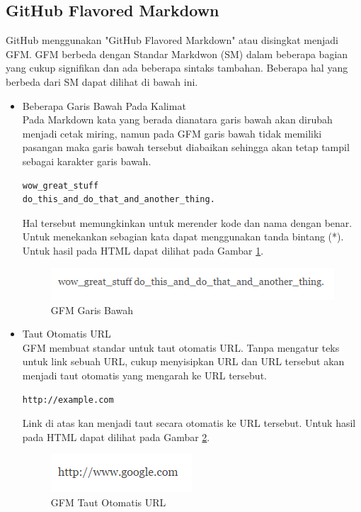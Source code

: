 \begin{itemize}
\begin{itemize}
\subsection{GitHub Flavored Markdown \cite{Markdown:2015}}
GitHub menggunakan "GitHub Flavored Markdown" atau disingkat menjadi GFM. GFM
berbeda dengan Standar Markdwon (SM) dalam beberapa bagian yang cukup signifikan
dan ada beberapa sintaks tambahan. Beberapa hal yang berbeda dari SM dapat
dilihat di bawah ini.

\begin{itemize}
\item Beberapa Garis Bawah Pada Kalimat\\
Pada Markdown kata yang berada dianatara garis bawah akan dirubah menjadi cetak
miring, namun pada GFM garis bawah tidak memiliki pasangan maka garis
bawah tersebut diabaikan sehingga akan tetap tampil sebagai karakter garis
bawah.
\begin{lstlisting}[basicstyle=\footnotesize]
wow_great_stuff
do_this_and_do_that_and_another_thing.
\end{lstlisting}
Hal tersebut memungkinkan untuk merender kode dan nama dengan benar. Untuk
menekankan sebagian kata dapat menggunakan tanda bintang (*). Untuk hasil pada
HTML dapat dilihat pada Gambar \ref{fig:gb}.
\begin{figure}[H]
\centering
\includegraphics[scale=1]{Gambar/garisbawah.png}
\caption[GFM Garis Bawah]{GFM Garis Bawah}
\label{fig:gb}
\end{figure}

\item Taut Otomatis URL\\
GFM membuat standar untuk taut otomatis URL. Tanpa mengatur teks untuk link
sebuah URL, cukup menyisipkan URL dan URL tersebut akan menjadi taut otomatis
yang mengarah ke URL tersebut.
\begin{lstlisting}[basicstyle=\footnotesize]
http://example.com
\end{lstlisting}
Link di atas kan menjadi taut secara otomatis ke URL tersebut. Untuk hasil pada
HTML dapat dilihat pada Gambar \ref{fig:gfml}.
\begin{figure}[H]
\centering
\includegraphics[scale=1]{Gambar/gfml.png}
\caption[GFM Taut Otomatis URL]{GFM Taut Otomatis URL}
\label{fig:gfml}
\end{figure}


\end{itemize}
\end{itemize}
\end{itemize}
